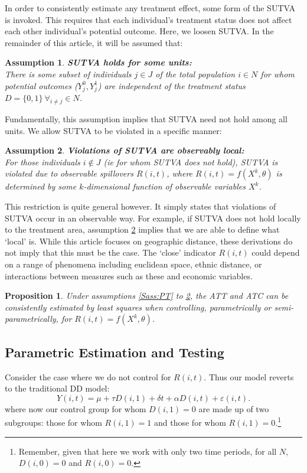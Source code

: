 \documentclass{article}
\newtheorem{assumption}{Assumption}
\newtheorem{proposition}{Proposition}
\begin{document}
\begin{spacing}{1.1}
In order to consistently estimate any treatment effect, some form of the
SUTVA is invoked.  This requires that each individual's treatment status does
not affect each other individual's potential outcome.  Here, we loosen SUTVA.
In the remainder of this article, it will be assumed that:
\begin{assumption}
\label{Sass:SUTVAs}
\textbf{SUTVA holds for some units:} \\
There is some subset of individuals $j\in J$ of the total population $i\in N$ 
for whom potential outcomes ($Y_j^0, Y_j^1$) are independent of the treatment 
status $D=\{0,1\}\ \forall_{i\neq j} \in N$.
\end{assumption}
\noindent Fundamentally, this assumption implies that SUTVA need not hold among 
all units.  We allow SUTVA to be violated in a specific manner:
\begin{assumption}
\label{Sass:SUTVAl}
\textbf{Violations of SUTVA are observably local:} \\ 
For those individuals $i\notin J$ (ie for whom SUTVA does not hold), SUTVA is
violated due to observable spillovers $R(i,t)$, where $R(i,t)=f(X^k,\theta)$
is determined by some $k$-dimensional function of observable variables $X^k$.
\end{assumption}
\vspace{-4mm}
\noindent This restriction is quite general however.  It simply states that
violations of SUTVA occur in an observable way.  For example, if SUTVA does
not hold locally to the treatment area, assumption \ref{Sass:SUTVAl} implies
that we are able to define what `local' is.  While this article focuses on
geographic distance, these derivations do not imply that this must be the
case.  The `close' indicator $R(i,t)$ could depend on a range of phenomena
including euclidean space, ethnic distance, or interactions between measures
such as these and economic variables.


\begin{proposition}
\label{Pass:ATT}
Under assumptions \ref{Sass:PT} to \ref{Sass:SUTVAl}, the ATT and ATC can be 
consistently estimated by least squares when controlling, parametrically or
semi-parametrically, for $R(i,t)=f(X^k,\theta)$.
\end{proposition}


\subsection{Parametric Estimation and Testing}
Consider the case where we do not control for $R(i,t)$.  Thus our model reverts
to the traditional DD model:
\begin{equation}
\label{Seqn:tDD}
Y(i,t)=\mu+\tau D(i,1) + \delta t + \alpha D(i,t) +  \varepsilon(i,t).
\end{equation}
where now our control group for whom $D(i,1)=0$ are made up of two subgroups:
those for whom $R(i,1)=1$ and those for whom $R(i,1)=0$.\footnote{Remember, given 
that here we work with only two time periods, for all $N$, $D(i,0)=0$ and 
$R(i,0)=0$.}


\end{spacing}
\end{document}
